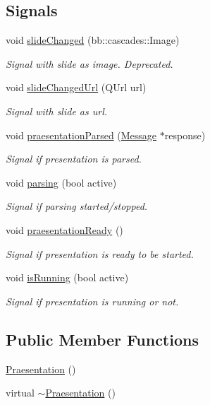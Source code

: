 \subsection*{Signals}
\begin{DoxyCompactItemize}
\item 
void \hyperlink{class_praesentation_ad1128436589fd75a48aa710ae210471f}{slide\+Changed} (bb\+::cascades\+::\+Image)
\begin{DoxyCompactList}\small\item\em Signal with slide as image. Deprecated. \end{DoxyCompactList}\item 
void \hyperlink{class_praesentation_ae5584b494f754ff3061d64d0459cb990}{slide\+Changed\+Url} (Q\+Url url)
\begin{DoxyCompactList}\small\item\em Signal with slide as url. \end{DoxyCompactList}\item 
void \hyperlink{class_praesentation_a2e2b197daa18681fabf4a1c150d15080}{praesentation\+Parsed} (\hyperlink{class_message}{Message} $\ast$response)
\begin{DoxyCompactList}\small\item\em Signal if presentation is parsed. \end{DoxyCompactList}\item 
void \hyperlink{class_praesentation_a603de77e2cb53c702fb060cae8da669d}{parsing} (bool active)
\begin{DoxyCompactList}\small\item\em Signal if parsing started/stopped. \end{DoxyCompactList}\item 
void \hyperlink{class_praesentation_a67f5b3dc02f779822fd1467811bb13e1}{praesentation\+Ready} ()
\begin{DoxyCompactList}\small\item\em Signal if presentation is ready to be started. \end{DoxyCompactList}\item 
void \hyperlink{class_praesentation_af3a6c3f0988915478059fa82a2504c1e}{is\+Running} (bool active)
\begin{DoxyCompactList}\small\item\em Signal if presentation is running or not. \end{DoxyCompactList}\end{DoxyCompactItemize}
\subsection*{Public Member Functions}
\begin{DoxyCompactItemize}
\item 
\hyperlink{class_praesentation_a93b957c384c8150717202f44ddb7562d}{Praesentation} ()
\item 
virtual \hyperlink{class_praesentation_a880033dd8575b311349a96884b0988ad}{$\sim$\+Praesentation} ()
\end{DoxyCompactItemize}


